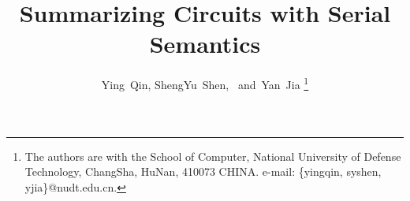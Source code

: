 \documentclass[journal]{IEEEtran}
\begin{document}
%
\title{Summarizing Circuits with Serial Semantics}
%
%
%

\author{Ying~Qin,
ShengYu~Shen,~
        and~Yan~Jia%
\thanks{The authors are with the School of Computer,
National University of Defense Technology, ChangSha,
HuNan, 410073 CHINA. e-mail: \{yingqin, syshen, yjia\}@nudt.edu.cn.}%
}
%
%
\end{document}
